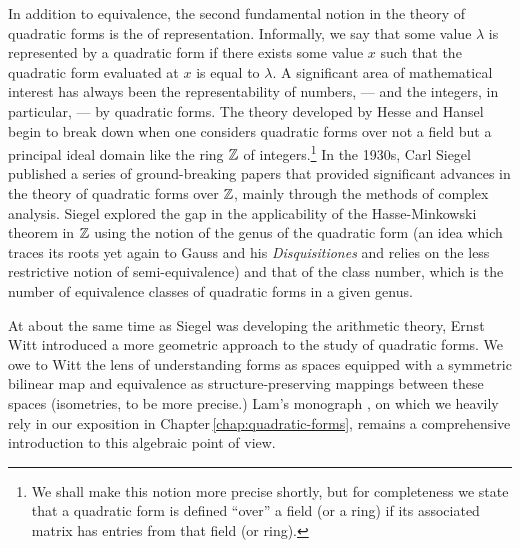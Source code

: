 In addition to equivalence, the second fundamental notion in the theory of quadratic forms is the of representation. Informally, we say that some value \(\lambda\) is represented by a quadratic form if there exists some value \(x\) such that the quadratic form evaluated at \(x\) is equal to \(\lambda\). A significant area of mathematical interest has always been the representability of numbers, --- and the integers, in particular, --- by quadratic forms. The theory developed by Hesse and Hansel begin to break down when one considers quadratic forms over not a field but a principal ideal domain like the ring \(\mathbb{Z}\) of integers.\footnote{We shall make this notion more precise shortly, but for completeness we state that a quadratic form is defined ``over'' a field (or a ring) if its associated matrix has entries from that field (or ring).} In the 1930s, Carl Siegel published a series of ground-breaking papers that provided significant advances in the theory of quadratic forms over \(\mathbb{Z}\), mainly through the methods of complex analysis. Siegel explored the gap in the applicability of the Hasse-Minkowski theorem in \(\mathbb{Z}\) using the notion of the genus of the quadratic form (an idea which traces its roots yet again to Gauss and his \emph{Disquisitiones} and relies on the less restrictive notion of semi-equivalence) and that of the class number, which is the number of equivalence classes of quadratic forms in a given genus. \cite{gerstein2008basic}

At about the same time as Siegel was developing the arithmetic theory, Ernst Witt introduced a more geometric approach to the study of quadratic forms. We owe to Witt the lens of understanding forms as spaces equipped with a symmetric bilinear map and equivalence as structure-preserving mappings between these spaces (isometries, to be more precise.) Lam's monograph \cite{lam1973quadratic}, on which we heavily rely in our exposition in Chapter\,\ref{chap:quadratic-forms}, remains a comprehensive introduction to this algebraic point of view.